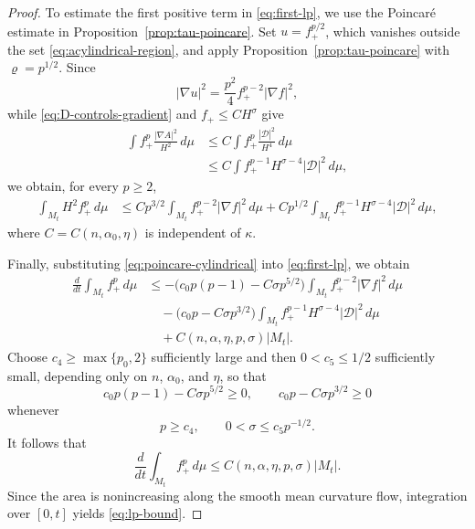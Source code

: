 \documentclass[11pt,reqno]{amsart}
\theoremstyle{definition}
\theoremstyle{remark}
\numberwithin{equation}{section}
\begin{document}
\begin{proof}
To estimate the first positive term in \eqref{eq:first-lp}, we use the Poincar\'e estimate in Proposition~\ref{prop:tau-poincare}. Set $u=f_+^{p/2}$, which vanishes
outside the set \eqref{eq:acylindrical-region}, and apply
Proposition~\ref{prop:tau-poincare} with $\varrho=p^{1/2}$.  Since
\begin{equation*}
 |\nabla u|^2=\frac{p^2}{4}f_+^{p-2}|\nabla f|^2,
\end{equation*}
while \eqref{eq:D-controls-gradient} and $f_+\leq CH^\sigma$ give
\begin{align*}
 \int f_+^p\frac{|\nabla A|^2}{H^2}\,d\mu
 &\leq C\int f_+^p\frac{|\mathcal D|^2}{H^4}\,d\mu\\
 &\leq C\int f_+^{p-1}H^{\sigma-4}|\mathcal D|^2\,d\mu,
\end{align*}
we obtain, for every $p\geq2$,
\begin{align}
 \int_{M_t}H^2f_+^p\,d\mu
 &\leq Cp^{3/2}\int_{M_t}f_+^{p-2}|\nabla f|^2\,d\mu
 +Cp^{1/2}\int_{M_t}f_+^{p-1}H^{\sigma-4}
              |\mathcal D|^2\,d\mu,
 \label{eq:poincare-cylindrical}
\end{align}
where $C=C(n,\alpha_0,\eta)$ is independent of $\kappa$.

Finally, substituting \eqref{eq:poincare-cylindrical} into
\eqref{eq:first-lp}, we obtain
\begin{align*}
 \frac{d}{dt}\int_{M_t}f_+^p\,d\mu
 &\leq
 -\bigl(c_0p(p-1)-C\sigma p^{5/2}\bigr)
 \int_{M_t}f_+^{p-2}|\nabla f|^2\,d\mu\\
 &\quad
 -\bigl(c_0p-C\sigma p^{3/2}\bigr)
 \int_{M_t}f_+^{p-1}H^{\sigma-4}
 |\mathcal D|^2\,d\mu\\
 &\quad
 +C(n,\alpha,\eta,p,\sigma)|M_t|.
\end{align*}
Choose $c_4\geq\max\{p_0,2\}$ sufficiently large and then
$0<c_5\leq1/2$ sufficiently small, depending only on $n$, $\alpha_0$, and
$\eta$, so that
\begin{equation*}
 c_0p(p-1)-C\sigma p^{5/2}\geq0,
 \qquad
 c_0p-C\sigma p^{3/2}\geq0
\end{equation*}
whenever
\begin{equation*}
 p\geq c_4,
 \qquad
 0<\sigma\leq c_5p^{-1/2}.
\end{equation*}
It follows that
\begin{equation*}
 \frac{d}{dt}\int_{M_t}f_+^p\,d\mu
 \leq C(n,\alpha,\eta,p,\sigma)|M_t|.
\end{equation*}
Since the area is nonincreasing along the smooth mean curvature flow,
integration over $[0,t]$ yields  \eqref{eq:lp-bound}.
\end{proof}
\end{document}
